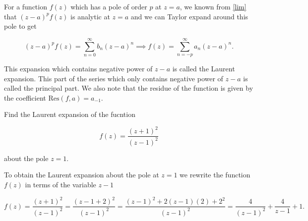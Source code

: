 \documentclass[english,a4paper,12pt]{report}
\begin{document}
For a function \(f(z)\) which has a pole of order \(p \) at \(z = a\), we known from \cref{lim} that \((z-a)^{p} f(z) \) is analytic at \(z  = a\) and we can Taylor expand around this pole to get

\begin{equation}
    (z-a)^{p} f(z) =  \sum_{n=0}^{\infty} b_{n} (z-a)^{n} \implies f(z) = \sum_{n=-p}^{\infty} a_{n} (z-a)^{n}.   
\end{equation}

This expansion which contains negative power of \(z-a\) is called the Laurent expansion. This part of the series which only contains negative power of \(z-a\) is called the principal part. We also note that the residue of the function is given by the coefficient \(\text{Res}(f,a) = a_{-1} \). 

{Find the Laurent expansion of the fucntion 

\begin{equation}
    f(z) = \frac{(z+1)^2}{(z-1)^2} 
\end{equation}

about the pole \(z = 1\). 
}
{To obtain the Laurent expansion about the pole at \(z = 1\) we rewrite the function \(f(z)\) in terms of the variable \(z-1\)  

\begin{equation}
    f(z) = \frac{(z+1)^2}{(z-1)^2} = \frac{(z-1+2)^2}{(z-1)^2} = \frac{(z-1)^2+2(z-1)(2)+2^2}{(z-1)^2} = \frac{4}{(z-1)^2} + \frac{4}{z-1} + 1.
\end{equation}
} 
\end{document}
